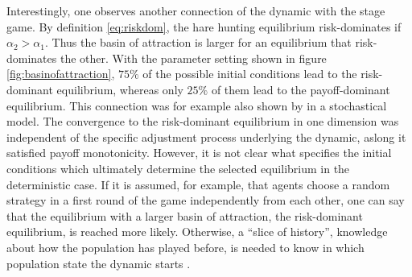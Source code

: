 Interestingly, one observes another connection of the 
dynamic with the stage game. 
By definition \eqref{eq:riskdom}, 
the hare hunting equilibrium risk-dominates if $\alpha_2 > \alpha_1$.
Thus the basin of attraction is larger for an equilibrium that 
risk-dominates the other. With the parameter setting shown
in figure \ref{fig:basinofattraction}, $75\%$ of the possible initial 
conditions lead to the risk-dominant equilibrium, whereas only $25\%$ of 
them lead to the payoff-dominant equilibrium. This 
connection was for example also shown by \textcite{kandori_learning_1993} 
in a stochastical model. The convergence to the risk-dominant equilibrium
in one dimension was independent of the specific adjustment process 
underlying the dynamic, aslong it satisfied payoff monotonicity. 
However, it is not clear what specifies the 
initial conditions which ultimately determine the selected equilibrium in 
the deterministic case. 
If it is assumed, for example, that agents choose a random strategy 
in a first round of the game independently from each other, 
one can say that the equilibrium with a 
larger basin of attraction, the risk-dominant equilibrium, is reached more 
likely. Otherwise, a ``slice of history'', knowledge about how the population
has played before, is needed to know in which population
state the dynamic starts \parencite{friedman_economic_1998}. 
